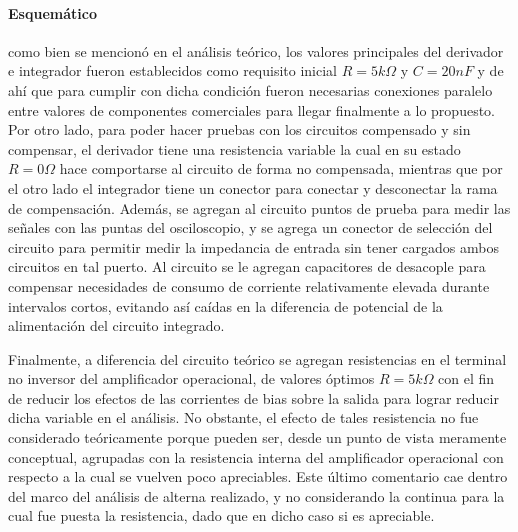 \paragraph*{Esquem\'atico} como bien se mencion\'o en el an\'alisis te\'orico, los valores principales del derivador e integrador fueron establecidos
como requisito inicial $R = 5k \Omega$ y $C = 20nF$ y de ah\'i que para cumplir con dicha condici\'on fueron necesarias conexiones paralelo entre valores
de componentes comerciales para llegar finalmente a lo propuesto. Por otro lado, para poder hacer pruebas con los circuitos compensado y sin compensar, el derivador
tiene una resistencia variable la cual en su estado $R = 0 \Omega$ hace comportarse al circuito de forma no compensada, mientras que por el otro lado el
integrador tiene un conector para conectar y desconectar la rama de compensaci\'on.
Adem\'as, se agregan al circuito puntos de prueba para medir las se\~nales con las puntas del osciloscopio, y se agrega un conector de selecci\'on del circuito
para permitir medir la impedancia de entrada sin tener cargados ambos circuitos en tal puerto. Al circuito se le agregan capacitores de desacople para compensar necesidades de consumo de corriente relativamente elevada durante intervalos
cortos, evitando así caídas en la diferencia de potencial de la alimentaci\'on del circuito integrado.

Finalmente, a diferencia del circuito te\'orico se agregan resistencias en el terminal no inversor del amplificador operacional, de valores \'optimos $R = 5k \Omega$ con el fin
de reducir los efectos de las corrientes de bias sobre la salida para lograr reducir dicha variable en el an\'alisis. No obstante, el efecto de tales resistencia no fue considerado
te\'oricamente porque pueden ser, desde un punto de vista meramente conceptual, agrupadas con la resistencia interna del amplificador operacional con respecto a la cual se vuelven poco apreciables.
Este \'ultimo comentario cae dentro del marco del an\'alisis de alterna realizado, y no considerando la continua para la cual fue puesta la resistencia, dado que en dicho caso si es apreciable.

